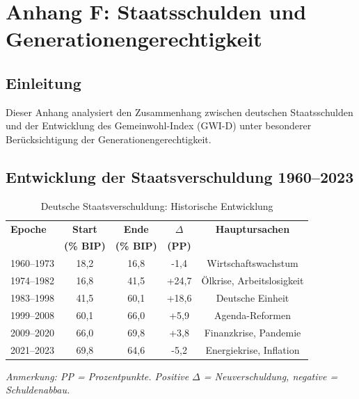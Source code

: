 \chapter{Anhang F: Staatsschulden und Generationengerechtigkeit}
\label{chap:anhang_f}

\section*{Einleitung}
Dieser Anhang analysiert den Zusammenhang zwischen deutschen Staatsschulden und der Entwicklung des Gemeinwohl-Index (GWI-D) unter besonderer Berücksichtigung der Generationengerechtigkeit.

\section{Entwicklung der Staatsverschuldung 1960–2023}

\begin{table}[ht]
    \centering
    \footnotesize
    \caption{Deutsche Staatsverschuldung: Historische Entwicklung}
    \label{tab:staatsverschuldung_entwicklung}
    \begin{tabular}{@{}lcccc@{}}
        \toprule
        \textbf{Epoche} & \textbf{Start} & \textbf{Ende} & \textbf{$\Delta$} & \textbf{Hauptursachen} \\
        & \textbf{(\% BIP)} & \textbf{(\% BIP)} & \textbf{(PP)} & \\
        \midrule
        1960–1973 & 18,2 & 16,8 & -1,4 & Wirtschaftswachstum \\
        1974–1982 & 16,8 & 41,5 & +24,7 & Ölkrise, Arbeitslosigkeit \\
        1983–1998 & 41,5 & 60,1 & +18,6 & Deutsche Einheit \\
        1999–2008 & 60,1 & 66,0 & +5,9 & Agenda-Reformen \\
        2009–2020 & 66,0 & 69,8 & +3,8 & Finanzkrise, Pandemie \\
        2021–2023 & 69,8 & 64,6 & -5,2 & Energiekrise, Inflation \\
        \bottomrule
    \end{tabular}
\end{table}

\begin{flushleft}
\scriptsize{\textit{Anmerkung: PP = Prozentpunkte. Positive $\Delta$ = Neuverschuldung, negative = Schuldenabbau.}}
\end{flushleft}

